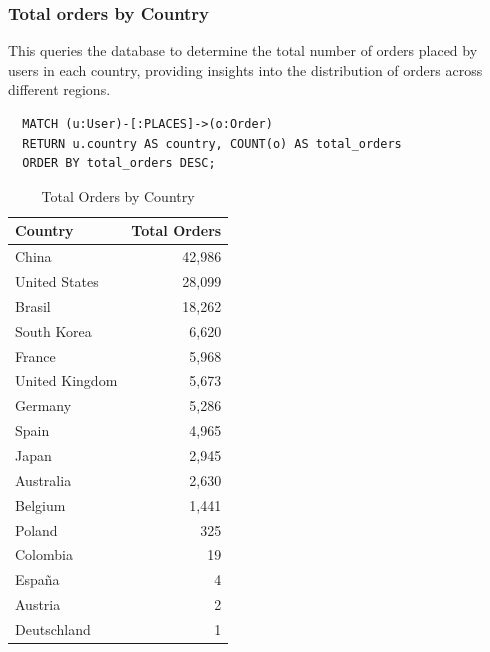 \documentclass[a4paper,12pt]{article}
\begin{document}
\subsubsection{Total orders by Country}
This queries the database to determine the total number of orders placed by users in each country, providing insights into the distribution of orders across different regions.
\begin{verbatim}
  MATCH (u:User)-[:PLACES]->(o:Order)
  RETURN u.country AS country, COUNT(o) AS total_orders
  ORDER BY total_orders DESC;
\end{verbatim}
\begin{table}[h!]
  \centering
  \caption{Total Orders by Country}
  \label{tab:total_orders}
  \begin{tabular}{l r}
      \toprule
      \textbf{Country} & \textbf{Total Orders} \\
      \midrule
      China           & 42,986 \\
      United States   & 28,099 \\
      Brasil          & 18,262 \\
      South Korea     & 6,620  \\
      France          & 5,968  \\
      United Kingdom  & 5,673  \\
      Germany         & 5,286  \\
      Spain           & 4,965  \\
      Japan           & 2,945  \\
      Australia       & 2,630  \\
      Belgium         & 1,441  \\
      Poland          & 325    \\
      Colombia        & 19     \\
      España          & 4      \\
      Austria         & 2      \\
      Deutschland     & 1      \\
      \bottomrule
  \end{tabular}
\end{table}
\end{document}
